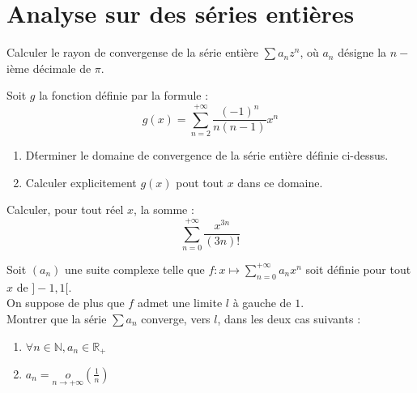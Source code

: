 \section{Analyse sur des s\'eries enti\`eres}

\begin{exer}
Calculer le rayon de convergense de la s\'erie enti\`ere $\sum a_n z^n$, o\`u $a_n$ d\'esigne la $n-$i\`eme d\'ecimale de $\pi$.
\end{exer}

\begin{exer}
Soit $g$ la fonction d\'efinie par la formule :\[g(x)=\sum\limits_{n=2}^{+\infty}\frac{(-1)^n}{n(n-1)}x^n\]
\begin{enumerate}
\item D\'terminer le domaine de convergence de la s\'erie enti\`ere d\'efinie ci-dessus.
\item Calculer explicitement $g(x)$ pout tout $x$ dans ce domaine.
\end{enumerate}
\end{exer}

\begin{exer}
Calculer, pour tout r\'eel $x$, la somme : \[\sum\limits_{n=0}^{+\infty}\frac{x^{3n}}{(3n)!}\]
\end{exer}

\begin{exer}
Soit $(a_n)$ une suite complexe telle que $f:x\mapsto\sum\limits_{n=0}^{+\infty}a_nx^n$ soit d\'efinie pour tout $x$ de $]-1,1[$.\\
On suppose de plus que $f$ admet une limite $l$ \`a gauche de $1$.\\
Montrer que la s\'erie $\sum a_n$ converge, vers $l$, dans les deux cas suivants :
\begin{enumerate}
\item $\forall n \in \mathbb{N} , a_n \in \mathbb{R}_+$
\item $a_n = \underset{n\rightarrow +\infty}{o}(\frac{1}{n})$
\end{enumerate}
\end{exer}
